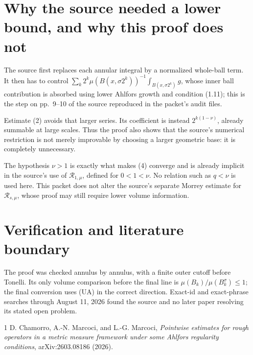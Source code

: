 \documentclass[11pt]{article}
\begin{document}
\section*{Why the source needed a lower bound, and why this proof does not}

The source first replaces each annular integral by a normalized whole-ball
term.  It then has to control
\(\sum_k2^k\mu(B(x,\sigma2^k))^{-1}\int_{B(x,\sigma2^k)}g\), whose inner
ball contribution is absorbed using lower Ahlfors growth and condition
(1.11); this is the step on pp.~9--10 of the source reproduced in the packet's
audit files.

Estimate (2) avoids that larger series.  Its coefficient is instead
\(2^{k(1-\nu)}\), already summable at large scales.  Thus the proof also
shows that the source's numerical restriction is not merely improvable by
choosing a larger geometric base: it is completely unnecessary.

The hypothesis \(\nu>1\) is exactly what makes (4) converge and is already
implicit in the source's use of \(\mathcal R_{1,\mu}\), defined for
\(0<1<\nu\).  No relation such as \(q<\nu\) is used here.  This packet does
not alter the source's separate Morrey estimate for \(\mathcal R_{s,\mu}\),
whose proof may still require lower volume information.

\section*{Verification and literature boundary}

The proof was checked annulus by annulus, with a finite outer cutoff before
Tonelli.  Its only volume comparison before the final line is
\(\mu(B_k)/\mu(B_k^\sigma)\le1\); the final conversion uses (UA) in the
correct direction.  Exact-id and exact-phrase searches through August 11,
2026 found the source and no later paper resolving its stated open problem.

\begin{thebibliography}{1}
D. Chamorro, A.-N. Marcoci, and L.-G. Marcoci,
\emph{Pointwise estimates for rough operators in a metric measure framework
under some Ahlfors regularity conditions}, arXiv:2603.08186 (2026).
\end{thebibliography}
\end{document}

